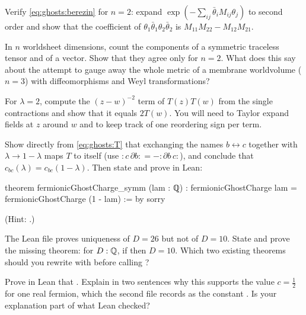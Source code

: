 \begin{exercise}[$\star$]\label{exr:ghosts:berezin}
Verify \cref{eq:ghosts:berezin} for $n=2$: expand
$\exp(-\sum_{ij}\bar\theta_iM_{ij}\theta_j)$ to second order and show that the coefficient of
$\theta_1\bar\theta_1\theta_2\bar\theta_2$ is $M_{11}M_{22}-M_{12}M_{21}$.
\end{exercise}

\begin{exercise}[$\star$]\label{exr:ghosts:count}
In $n$ worldsheet dimensions, count the components of a symmetric traceless tensor and of a
vector. Show that they agree only for $n=2$. What does this say about the attempt to gauge
away the whole metric of a membrane worldvolume ($n=3$) with diffeomorphisms and Weyl
transformations?
\end{exercise}

\begin{exercise}[$\star\star$]\label{exr:ghosts:lesssing}
For $\lambda=2$, compute the $(z-w)^{-2}$ term of $T(z)T(w)$ from the single contractions and
show that it equals $2T(w)$. You will need to Taylor expand fields at $z$ around $w$ and to
keep track of one reordering sign per term.
\end{exercise}

\begin{exercise}[$\star\star$]\label{exr:ghosts:symmetry}
Show directly from \cref{eq:ghosts:T} that exchanging the names $b\leftrightarrow c$ together
with $\lambda\to1-\lambda$ maps $T$ to itself (use ${:}c\,\partial b{:}=-{:}\partial b\,c{:}$),
and conclude that $c_{bc}(\lambda)=c_{bc}(1-\lambda)$. Then state and prove in Lean:
\begin{leancode}
theorem fermionicGhostCharge_symm (lam : ℚ) :
    fermionicGhostCharge lam = fermionicGhostCharge (1 - lam) := by
  sorry
\end{leancode}
(Hint: .)
\end{exercise}

\begin{exercise}[$\star\star$]\label{exr:ghosts:leanunique}
The Lean file proves uniqueness of $D=26$ but not of $D=10$. State and prove the missing
theorem: for $D:\mathbb{Q}$, if
 then
$D=10$. Which two existing theorems should you rewrite with before calling ?
\end{exercise}

\begin{exercise}[$\star\star$]\label{exr:ghosts:fermion}
Prove in Lean that . Explain in two sentences why
this supports the value $c=\tfrac12$ for one real fermion, which the second file records as
the constant . Is your explanation part of what Lean checked?
\end{exercise}

